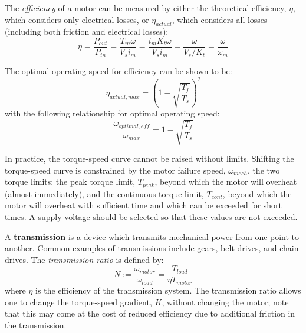 The \textit{efficiency} of a motor can be measured by either the theoretical efficiency, $\eta$, which considers only electrical losses, or $\eta_{actual}$, which considers all losses (including both friction and electrical losses):
\[\eta = \frac{P_{out}}{P_{in}} = \frac{T_m \omega}{V_s i_m} = \frac{i_m K_t \omega}{V_s i_m} = \frac{\omega}{V_s/K_t} = \boxed{\frac{\omega}{\omega_m}}\]

The optimal operating speed for efficiency can be shown to be: \[\eta_{actual,max} = \left(1-\sqrt{\frac{T_f}{T_s}}\right)^2\] with the following relationship for optimal operating speed: \[\frac{\omega_{optimal,eff}}{\omega_{max}} = 1-\sqrt{\frac{T_f}{T_s}}\]


In practice, the torque-speed curve cannot be raised without limits. Shifting the torque-speed curve is constrained by the motor failure speed, $\omega_{mech}$, the two torque limits: the peak torque limit, $T_{peak}$, beyond which the motor will overheat (almost immediately), and the continuous torque limit, $T_{cont}$, beyond which the motor will overheat with sufficient time and which can be exceeded for short times. A supply voltage should be selected so that these values are not exceeded.




A \textbf{transmission} is a device which transmits mechanical power from one point to another. Common examples of transmissions include gears, belt drives, and chain drives. The \textit{transmission ratio} is defined by: \[N := \frac{\omega_{motor}}{\omega_{load}} = \frac{T_{load}}{\eta T_{motor}}\] where $\eta$ is the efficiency of the transmission system. The transmission ratio allows one to change the torque-speed gradient, $K$, without changing the motor; note that this may come at the cost of reduced efficiency due to additional friction in the transmission.

